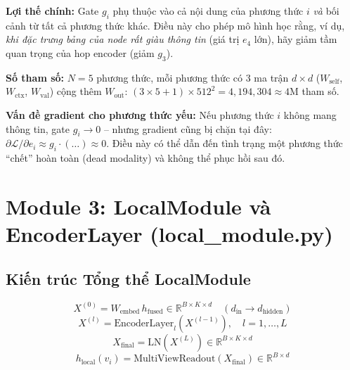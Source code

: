 \documentclass[12pt,a4paper]{article}
\begin{document}
\begin{insightbox}
\textbf{Lợi thế chính:} Gate $g_i$ phụ thuộc vào cả nội dung của phương thức $i$
\emph{và} bối cảnh từ tất cả phương thức khác. Điều này cho phép mô hình học rằng,
ví dụ, \emph{khi đặc trưng bảng của node rất giàu thông tin} (giá trị $e_4$ lớn),
hãy giảm tầm quan trọng của hop encoder (giảm $g_3$).

\textbf{Số tham số:} $N=5$ phương thức, mỗi phương thức có 3 ma trận $d \times d$
($W_\text{self}$, $W_\text{ctx}$, $W_\text{val}$) cộng thêm $W_\text{out}$:
$(3 \times 5 + 1) \times 512^2 = 4{,}194{,}304 \approx 4$M tham số.
\end{insightbox}

\begin{issuebox}
\textbf{Vấn đề gradient cho phương thức yếu:} Nếu phương thức $i$ không mang
thông tin, gate $g_i \to 0$ -- nhưng gradient cũng bị chặn tại đây:
$\partial \mathcal{L} / \partial e_i \approx g_i \cdot (\ldots) \approx 0$.
Điều này có thể dẫn đến tình trạng một phương thức ``chết'' hoàn toàn
(dead modality) và không thể phục hồi sau đó.
\end{issuebox}

\section{Module 3: LocalModule và EncoderLayer (local\_module.py)}

\subsection{Kiến trúc Tổng thể LocalModule}

\begin{mathbox}[title={LocalModule forward pass}]
\begin{equation}
  X^{(0)} = W_\text{embed}\, h_\text{fused} \in \mathbb{R}^{B \times K \times d}
  \quad (d_\text{in} \to d_\text{hidden})
\end{equation}
\begin{equation}
  X^{(l)} = \text{EncoderLayer}_l(X^{(l-1)}), \quad l = 1, \ldots, L
\end{equation}
\begin{equation}
  X_\text{final} = \text{LN}(X^{(L)}) \in \mathbb{R}^{B \times K \times d}
\end{equation}
\begin{equation}
  h_\text{local}(v_i) = \text{MultiViewReadout}(X_\text{final}) \in \mathbb{R}^{B \times d}
\end{equation}
\end{mathbox}
\end{document}
